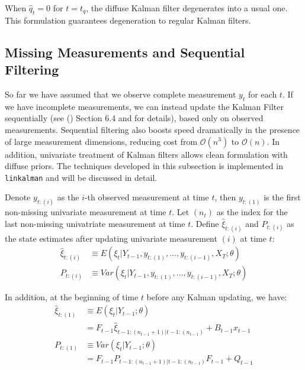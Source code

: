 \documentclass[10pt]{article}
\numberwithin{equation}{section}
\begin{document}
When $\hat{q}_{t}=0$ for $t=t_q$, the diffuse Kalman filter degenerates into a usual one. This formulation guarantees degeneration to regular Kalman filters.

\subsection{Missing Measurements and Sequential Filtering} \label{subsec:seq_filter}
So far we have assumed that we observe complete measurement $y_t$ for each $t$. If we have incomplete measurements, we can instead update the Kalman Filter sequentially (see (\cite{durbin_koopman_2001}) Section 6.4 and \cite{durbin_koopman_2000} for details), based only on observed measurements. Sequential filtering also boosts speed dramatically in the presence of large measurement dimensions, reducing cost from $\mathcal{O}(n^3)$ to $\mathcal{O}(n)$. In addition, univariate treatment of Kalman filters allows clean formulation with diffuse priors. The techniques developed in this subsection is implemented in \texttt{linkalman} and will be discussed in detail. 

Denote $y_{t:(i)}$ as the $i$-th observed measurement at time $t$, then $y_{t:(1)}$ is the first non-missing univariate measurement at time $t$. Let $(n_t)$ as the index for the last non-missing univatriate measurement at time $t$. Define $\hat{\xi}_{t:(i)}$ and $P_{t:(i)}$ as the state estimates after updating univariate measurement $(i)$ at time $t$:
\begin{align*}
    \hat{\xi}_{t:(i)} &\equiv E(\xi_t|Y_{t-1},y_{t:(1)},...,y_{t:(i-1)},X_T;\theta) \\
    P_{t:(i)} &\equiv Var(\xi_t|Y_{t-1},y_{t:(1)},...,y_{t:(i-1)},X_T;\theta) 
\end{align*}

In addition, at the beginning of time $t$ before any Kalman updating, we have:
\begin{align}
    \hat{\xi}_{t:(1)} &\equiv E(\xi_{t}|Y_{t-1};\theta)\nonumber \\
    &= F_{t-1}\hat{\xi}_{t-1:(n_{t-1}+1)|t-1:(n_{t-1})}+B_{t-1}x_{t-1} \label{eq:diff_xi_seq0} \\
    P_{t:(1)} &\equiv Var(\xi_{t}|Y_{t-1};\theta) \nonumber \\
    &= F_{t-1}P_{t-1:(n_{t-1}+1)|t-1:(n_{t-1})}F_{t-1} + Q_{t-1} \label{eq:diff_P_seq0}
\end{align}
\end{document}
